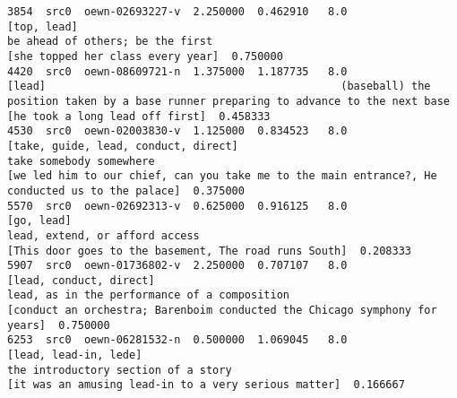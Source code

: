 \documentclass[a4paper,10pt,onecolumn,oneside,openright]{article}
\begin{document}
\begin{verbatim}
3854  src0  oewn-02693227-v  2.250000  0.462910   8.0                                               [top, lead]                                                                                                  be ahead of others; be the first                                                                                                                                                            [she topped her class every year]  0.750000
4420  src0  oewn-08609721-n  1.375000  1.187735   8.0                                                    [lead]                                              (baseball) the position taken by a base runner preparing to advance to the next base                                                                                                                                                              [he took a long lead off first]  0.458333
4530  src0  oewn-02003830-v  1.125000  0.834523   8.0                      [take, guide, lead, conduct, direct]                                                                                                           take somebody somewhere                                                                                              [we led him to our chief, can you take me to the main entrance?, He conducted us to the palace]  0.375000
5570  src0  oewn-02692313-v  0.625000  0.916125   8.0                                                [go, lead]                                                                                                    lead, extend, or afford access                                                                                                                                        [This door goes to the basement, The road runs South]  0.208333
5907  src0  oewn-01736802-v  2.250000  0.707107   8.0                                   [lead, conduct, direct]                                                                                      lead, as in the performance of a composition                                                                                                                   [conduct an orchestra; Barenboim conducted the Chicago symphony for years]  0.750000
6253  src0  oewn-06281532-n  0.500000  1.069045   8.0                                     [lead, lead-in, lede]                                                                                               the introductory section of a story                                                                                                                                         [it was an amusing lead-in to a very serious matter]  0.166667

\end{verbatim}
\end{document}
